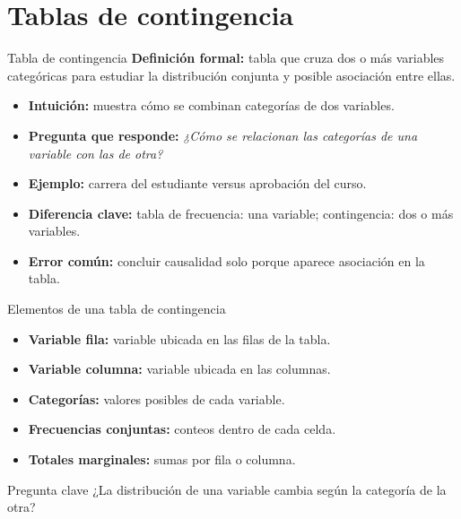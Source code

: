 \documentclass[aspectratio=169,11pt]{beamer}
\newcommand{\pregunta}[1]{\textbf{Pregunta que responde:} \emph{#1}}
\newcommand{\errorcomun}[1]{\textbf{Error común:} #1}
\newcommand{\diferencia}[1]{\textbf{Diferencia clave:} #1}
\begin{document}
\section{Tablas de contingencia}

\begin{frame}{Tabla de contingencia}
\textbf{Definición formal:} tabla que cruza dos o más variables categóricas para estudiar la distribución conjunta y posible asociación entre ellas.
\begin{itemize}
  \item \textbf{Intuición:} muestra cómo se combinan categorías de dos variables.
  \item \pregunta{¿Cómo se relacionan las categorías de una variable con las de otra?}
  \item \textbf{Ejemplo:} carrera del estudiante versus aprobación del curso.
  \item \diferencia{tabla de frecuencia: una variable; contingencia: dos o más variables.}
  \item \errorcomun{concluir causalidad solo porque aparece asociación en la tabla.}
\end{itemize}
\end{frame}

\begin{frame}{Elementos de una tabla de contingencia}
\begin{itemize}
  \item \textbf{Variable fila:} variable ubicada en las filas de la tabla.
  \item \textbf{Variable columna:} variable ubicada en las columnas.
  \item \textbf{Categorías:} valores posibles de cada variable.
  \item \textbf{Frecuencias conjuntas:} conteos dentro de cada celda.
  \item \textbf{Totales marginales:} sumas por fila o columna.
\end{itemize}
\begin{block}{Pregunta clave}
¿La distribución de una variable cambia según la categoría de la otra?
\end{block}
\end{frame}
\end{document}
